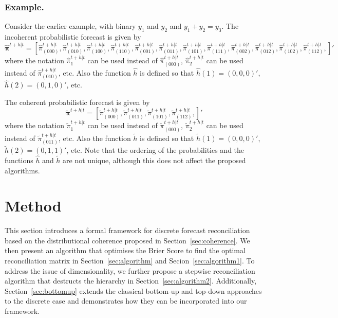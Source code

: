 \documentclass[a4paper,review,12pt,authoryear]{elsarticle}
\newcommand{\bpi}{\bm{\pi}}
\begin{document}
  \subsubsection*{\textbf{Example}.}
  
  Consider the earlier example, with binary $y_1$ and $y_2$ and $y_1+y_2=y_3$. The incoherent probabilistic forecast is given by
  \[
    \hat{\bpi}^{t+h|t}= \left[       
      \hat{\pi}^{t+h|t}_{(000)},
       \hat{\pi}^{t+h|t}_{(010)},
       \hat{\pi}^{t+h|t}_{(100)},
       \hat{\pi}^{t+h|t}_{(110)},
       \hat{\pi}^{t+h|t}_{(001)},
       \hat{\pi}^{t+h|t}_{(011)},
       \hat{\pi}^{t+h|t}_{(101)},
       \hat{\pi}^{t+h|t}_{(111)},
       \hat{\pi}^{t+h|t}_{(002)},
       \hat{\pi}^{t+h|t}_{(012)},
       \hat{\pi}^{t+h|t}_{(102)},
       \hat{\pi}^{t+h|t}_{(112)},
       \right]'
  \]
  where the notation $\hat{\pi}^{t+h|t}_{1}$ can be used instead of $\hat{\pi}^{t+h|t}_{(000)}$, $\hat{\pi}^{t+h|t}_{2}$ can be used instead of $\hat{\pi}^{t+h|t}_{(010)}$, etc. Also the function $\hat{h}$ is defined so that $\hat{h}(1)=(0,0,0)'$, $\hat{h}(2)=(0,1,0)'$, etc.
  
  The coherent probabilistic forecast is given by
  \[
  \tilde{\bpi}^{t+h|t}=\left[
  \tilde{\pi}^{t+h|t}_{(000)},
  \tilde{\pi}^{t+h|t}_{(011)},
  \tilde{\pi}^{t+h|t}_{(101)},
  \tilde{\pi}^{t+h|t}_{(112)},
  \right]'\]
  where the notation $\tilde{\pi}^{t+h|t}_{1}$ can be used instead of $\tilde{\pi}^{t+h|t}_{(000)}$, $\tilde{\pi}^{t+h|t}_{2}$ can be used instead of $\tilde{\pi}^{t+h|t}_{(011)}$, etc. Also the function $\tilde{h}$ is defined so that $\tilde{h}(1)=(0,0,0)'$, $\tilde{h}(2)=(0,1,1)'$, etc. Note that the ordering of the probabilities and the functions $\hat{h}$ and $\tilde{h}$ are not unique, although this does not affect the proposed algorithms.

\section{Method}
\label{sec:method}

This section introduces a formal framework for discrete forecast reconciliation based on the distributional coherence proposed in Section~\ref{sec:coherence}.
We then present an algorithm that optimises the Brier Score to find the optimal reconciliation matrix in Section~\ref{sec:algorithm} and Secion~\ref{sec:algorithm1}.
To address the issue of dimensionality, we further propose a stepwise reconciliation algorithm that destructs the hierarchy in Section~\ref{sec:algorithm2}.
Additionally, Section~\ref{sec:bottomup} extends the classical bottom-up and top-down approaches to the discrete case and demonstrates how they can be incorporated into our framework.
\end{document}
